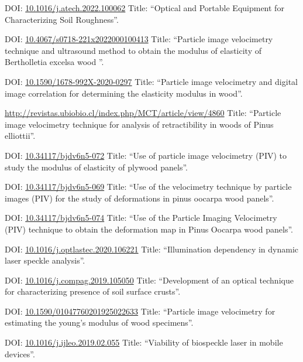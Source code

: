 \documentclass[11pt,a4paper,sans]{moderncv} %
\newcommand{\doiurl}[1]{\href{https://doi.org/#1}{#1}}
\begin{document}
	      {DOI: \doiurl{10.1016/j.atech.2022.100062} }{}{}
	      {Title: ``Optical and Portable Equipment for Characterizing Soil Roughness''.}
	      
	      {DOI: \doiurl{10.4067/s0718-221x2022000100413} }{}{}
	      {Title: ``Particle image velocimetry technique and ultrasound method to obtain the modulus of elasticity of Bertholletia excelsa wood ''.}
	      
	      {DOI: \doiurl{10.1590/1678-992X-2020-0297} }{}{}
	      {Title: ``Particle image velocimetry and digital image correlation for determining the elasticity modulus in wood''.}
	      
	      {\url{http://revistas.ubiobio.cl/index.php/MCT/article/view/4860}}{}{}
	      {Title: ``Particle image velocimetry technique for analysis of retractibility in woods of Pinus elliottii''.}
	      
	      {DOI: \doiurl{10.34117/bjdv6n5-072}}{}{}
	      {Title: ``Use of particle image velocimetry (PIV) to study the modulus of elasticity of plywood panels''.}

	      {DOI: \doiurl{10.34117/bjdv6n5-069}}{}{}
	      {Title: ``Use of the velocimetry technique by particle images (PIV) for the study of deformations in pinus oocarpa wood panels''.}

	      {DOI: \doiurl{10.34117/bjdv6n5-074}}{}{}
	      {Title: ``Use of the Particle Imaging Velocimetry (PIV) technique to obtain the deformation map in Pinus Oocarpa wood panels''.}

	      {DOI: \doiurl{10.1016/j.optlastec.2020.106221}}{}{}
	      {Title: ``Illumination dependency in dynamic laser speckle analysis''.}

	      {DOI: \doiurl{10.1016/j.compag.2019.105050}}{}{}
	      {Title: ``Development of an optical technique for characterizing presence of soil surface crusts''.}

	      {DOI: \doiurl{10.1590/01047760201925022633}}{}{}
	      {Title: ``Particle image velocimetry for estimating the young’s modulus of wood specimens''.}

	      {DOI: \doiurl{10.1016/j.ijleo.2019.02.055}}{}{}
	      {Title: ``Viability of biospeckle laser in mobile devices''.}
\end{document}
